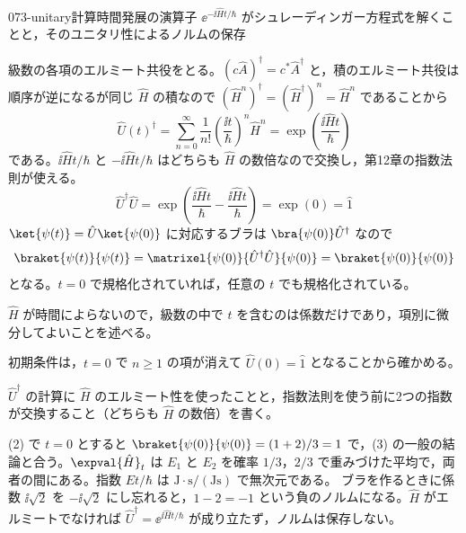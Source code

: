 \documentclass[uplatex,dvipdfmx,a4paper,11pt]{jsarticle}
\begin{document}
\begin{mondai}{073-unitary}{計算}{時間発展の演算子 $\ee^{-\ii\hat{H}t/\hbar}$ がシュレーディンガー方程式を解くことと，そのユニタリ性によるノルムの保存}
\begin{tadashii}
 級数の各項のエルミート共役をとる。$(c\hat{A})^{\dagger}=c^{*}\hat{A}^{\dagger}$ と，積のエルミート共役は順序が逆になるが同じ $\hat{H}$ の積なので $(\hat{H}^{n})^{\dagger}=(\hat{H}^{\dagger})^{n}=\hat{H}^{n}$ であることから
\[ \hat{U}(t)^{\dagger}=\sum_{n=0}^{\infty}\frac{1}{n!}\left(\frac{\ii t}{\hbar}\right)^{n}\hat{H}^{n}=\exp\left(\frac{\ii\hat{H}t}{\hbar}\right) \]
である。$\ii\hat{H}t/\hbar$ と $-\ii\hat{H}t/\hbar$ はどちらも $\hat{H}$ の数倍なので交換し，第12章の指数法則が使える。
\[ \hat{U}^{\dagger}\hat{U}=\exp\left(\frac{\ii\hat{H}t}{\hbar}-\frac{\ii\hat{H}t}{\hbar}\right)=\exp(0)=\hat{1} \]
$\ket{\psi(t)}=\hat{U}\ket{\psi(0)}$ に対応するブラは $\bra{\psi(0)}\hat{U}^{\dagger}$ なので
\[ \braket{\psi(t)}{\psi(t)}=\matrixel{\psi(0)}{\hat{U}^{\dagger}\hat{U}}{\psi(0)}=\braket{\psi(0)}{\psi(0)} \]
となる。$t=0$ で規格化されていれば，任意の $t$ でも規格化されている。
\begin{ronten}
  \item {} $\hat{H}$ が時間によらないので，級数の中で $t$ を含むのは係数だけであり，項別に微分してよいことを述べる。
  \item {} 初期条件は，$t=0$ で $n\ge1$ の項が消えて $\hat{U}(0)=\hat{1}$ となることから確かめる。
  \item {} $\hat{U}^{\dagger}$ の計算に $\hat{H}$ のエルミート性を使ったことと，指数法則を使う前に2つの指数が交換すること（どちらも $\hat{H}$ の数倍）を書く。
\end{ronten}
\kenzan (2) で $t=0$ とすると $\braket{\psi(0)}{\psi(0)}=(1+2)/3=1$ で，(3) の一般の結論と合う。$\expval{\hat{H}}_{t}$ は $E_{1}$ と $E_{2}$ を確率 $1/3$，$2/3$ で重みづけた平均で，両者の間にある。指数 $Et/\hbar$ は $\unit{\joule}\cdot\unit{\second}/(\unit{\joule\second})$ で無次元である。
\tsumazuki ブラを作るときに係数 $\ii\sqrt{2}$ を $-\ii\sqrt{2}$ にし忘れると，$1-2=-1$ という負のノルムになる。$\hat{H}$ がエルミートでなければ $\hat{U}^{\dagger}=\ee^{\ii\hat{H}t/\hbar}$ が成り立たず，ノルムは保存しない。
\end{tadashii}
\end{mondai}
\end{document}
